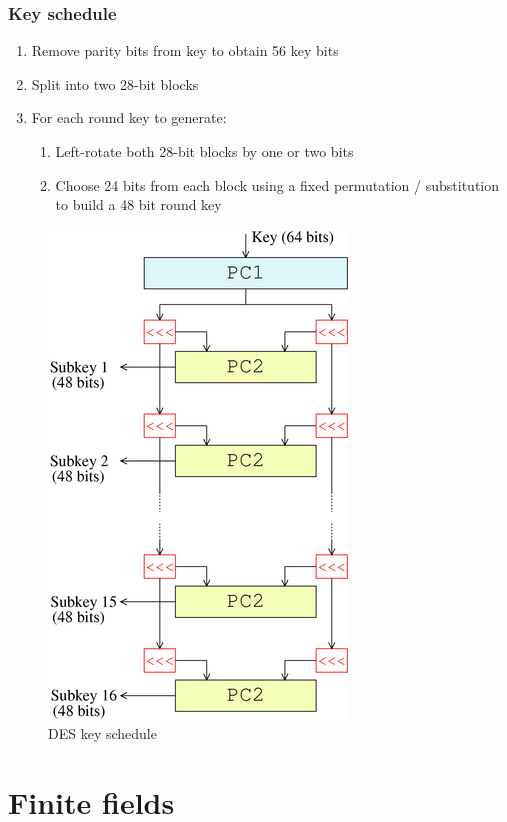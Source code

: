\documentclass[a4paper]{scrartcl}
\begin{document}
\subsubsection{Key schedule}

\begin{enumerate}
    \item Remove parity bits from key to obtain 56 key bits
    \item Split into two 28-bit blocks
    \item For each round key to generate:
    \begin{enumerate}
        \item Left-rotate both 28-bit blocks by one or two bits
        \item Choose 24 bits from each block using a fixed permutation / substitution
            to build a 48 bit round key
    \end{enumerate}
\end{enumerate}

\begin{figure}
    \centering
    \includegraphics[scale=0.5]{images/des-schedule.png}
    \caption{DES key schedule}
\end{figure}

\section{Finite fields}
\end{document}
